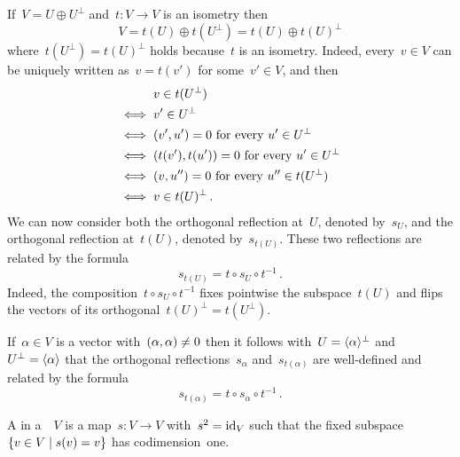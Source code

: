 \begin{recall}
\begin{enumerate}
      If~$V = U \oplus U^\perp$ and~$t \colon V \to V$ is an isometry then
      \[
        V
        =
        t(U)
        \oplus
        t(U^\perp)
        =
        t(U)
        \oplus
        t(U)^\perp
      \]
      where~$t(U^\perp) = t(U)^\perp$ holds because~$t$ is an isometry.
      Indeed, every~$v \in V$ can be uniquely written as~$v = t(v')$ for some~$v' \in V$, and then
      \begin{align*}
        {}&
        v \in t(U^\perp)
        \\
        \iff{}&
        v' \in U^\perp
        \\
        \iff{}&
        \text{$(v', u') = 0$ for every~$u' \in U^\perp$}
        \\
        \iff{}&
        \text{$(t(v'), t(u')) = 0$ for every~$u' \in U^\perp$}
        \\
        \iff{}&
        \text{$(v, u'') = 0$ for every~$u'' \in t(U^\perp)$}
        \\
        \iff{}&
        v \in t(U)^\perp \,.
      \end{align*}
      We can now consider both the orthogonal reflection at~$U$, denoted by~$s_U$, and the orthogonal reflection at~$t(U)$, denoted by~$s_{t(U)}$.
      These two reflections are related by the formula
      \[
        s_{t(U)} = t \circ s_U \circ t^{-1} \,.
      \]
      Indeed, the composition~$t \circ s_U \circ t^{-1}$ fixes pointwise the subspace~$t(U)$ and flips the vectors of its orthogonal~$t(U)^\perp = t(U^\perp)$.
      
      If~$\alpha \in V$ is a vector with~$(\alpha, \alpha) \neq 0$ then it follows with~$U = \langle\alpha\rangle^\perp$ and~$U^\perp = \langle\alpha\rangle$ that the orthogonal reflections~$s_\alpha$ and~$s_{t(\alpha)}$ are well-defined and related by the formula
      \[
        s_{t(\alpha)}
        =
        t \circ s_\alpha \circ t^{-1} \,.
      \]
  \end{enumerate}
\end{recall}


\begin{definition}
  A  in a~{\vectorspace{$\kf$}}~$V$ is a map~$s \colon V \to V$ with~$s^2 = \operatorname{id}_V$ such that the fixed subspace~$\{v \in V \suchthat s(v) = v\}$ has codimension~one.
\end{definition}


